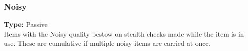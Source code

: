 \subsubsection{Noisy}
\label{iqty:noisy}
\textbf{Type:} Passive\\
Items with the Noisy quality bestow \setback on stealth
checks made while the item is in use. These \setback are
cumulative if multiple noisy items are carried at once.
